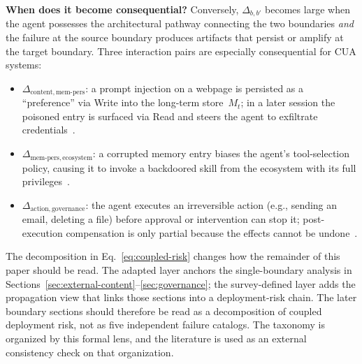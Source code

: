 \smallskip
\noindent\textbf{When does it become consequential?}
Conversely, $\Delta_{b,b'}$ becomes large when the agent possesses the architectural pathway connecting the two boundaries \emph{and} the failure at the source boundary produces artifacts that persist or amplify at the target boundary. Three interaction pairs are especially consequential for CUA systems:
\begin{itemize}[leftmargin=1.5em, nosep]
  \item $\Delta_{\text{content},\,\text{mem-pers}}$: a prompt injection on a webpage is persisted as a ``preference'' via Write into the long-term store~$M_t$; in a later session the poisoned entry is surfaced via Read and steers the agent to exfiltrate credentials~\cite{minja2025,autonomousagentthreats2026}.
  \item $\Delta_{\text{mem-pers},\,\text{ecosystem}}$: a corrupted memory entry biases the agent's tool-selection policy, causing it to invoke a backdoored skill from the ecosystem with its full privileges~\cite{storagetosteering2026,agentskillswild2026}.
  \item $\Delta_{\text{action},\,\text{governance}}$: the agent executes an irreversible action (e.g., sending an email, deleting a file) before approval or intervention can stop it; post-execution compensation is only partial because the effects cannot be undone~\cite{safearena2025,shan2026dontletclawgrip}.
\end{itemize}

The decomposition in Eq.~\ref{eq:coupled-risk} changes how the remainder of this paper should be read. The adapted layer anchors the single-boundary analysis in Sections~\ref{sec:external-content}--\ref{sec:governance}; the survey-defined layer adds the propagation view that links those sections into a deployment-risk chain. The later boundary sections should therefore be read as a decomposition of coupled deployment risk, not as five independent failure catalogs. The taxonomy is organized by this formal lens, and the literature is used as an external consistency check on that organization.


\FloatBarrier
\clearpage

